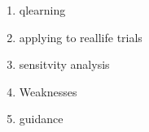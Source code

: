 \documentclass{article}
\begin{document}
\begin{enumerate}
	\item qlearning
	\item applying to reallife trials
	\item sensitvity analysis
	\item Weaknesses
	\item guidance
\end{enumerate}
\end{document}
